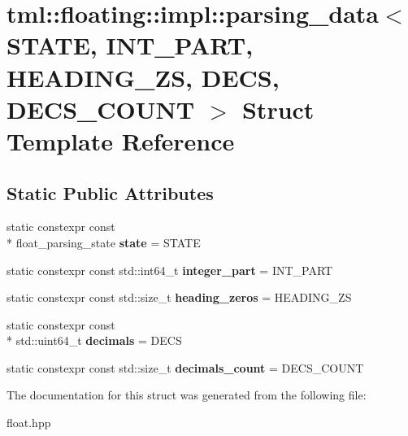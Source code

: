 \hypertarget{structtml_1_1floating_1_1impl_1_1parsing__data}{\section{tml\+:\+:floating\+:\+:impl\+:\+:parsing\+\_\+data$<$ S\+T\+A\+T\+E, I\+N\+T\+\_\+\+P\+A\+R\+T, H\+E\+A\+D\+I\+N\+G\+\_\+\+Z\+S, D\+E\+C\+S, D\+E\+C\+S\+\_\+\+C\+O\+U\+N\+T $>$ Struct Template Reference}
\label{structtml_1_1floating_1_1impl_1_1parsing__data}
}
\subsection*{Static Public Attributes}
\begin{DoxyCompactItemize}
\item 
\hypertarget{structtml_1_1floating_1_1impl_1_1parsing__data_af228f50016a6d00dd2acb4e27a0d3c16}{static constexpr const \\*
float\+\_\+parsing\+\_\+state {\bfseries state} = S\+T\+A\+T\+E}\label{structtml_1_1floating_1_1impl_1_1parsing__data_af228f50016a6d00dd2acb4e27a0d3c16}

\item 
\hypertarget{structtml_1_1floating_1_1impl_1_1parsing__data_ac50563638533c911c27b234af2cc0484}{static constexpr const std\+::int64\+\_\+t {\bfseries integer\+\_\+part} = I\+N\+T\+\_\+\+P\+A\+R\+T}\label{structtml_1_1floating_1_1impl_1_1parsing__data_ac50563638533c911c27b234af2cc0484}

\item 
\hypertarget{structtml_1_1floating_1_1impl_1_1parsing__data_a8f3236517d46c72c13f1ad1893375958}{static constexpr const std\+::size\+\_\+t {\bfseries heading\+\_\+zeros} = H\+E\+A\+D\+I\+N\+G\+\_\+\+Z\+S}\label{structtml_1_1floating_1_1impl_1_1parsing__data_a8f3236517d46c72c13f1ad1893375958}

\item 
\hypertarget{structtml_1_1floating_1_1impl_1_1parsing__data_a36dad24e3be4da8817eb9f158915060c}{static constexpr const \\*
std\+::uint64\+\_\+t {\bfseries decimals} = D\+E\+C\+S}\label{structtml_1_1floating_1_1impl_1_1parsing__data_a36dad24e3be4da8817eb9f158915060c}

\item 
\hypertarget{structtml_1_1floating_1_1impl_1_1parsing__data_a4b45d794106cf67355327b9b769aeccc}{static constexpr const std\+::size\+\_\+t {\bfseries decimals\+\_\+count} = D\+E\+C\+S\+\_\+\+C\+O\+U\+N\+T}\label{structtml_1_1floating_1_1impl_1_1parsing__data_a4b45d794106cf67355327b9b769aeccc}

\end{DoxyCompactItemize}


The documentation for this struct was generated from the following file\+:\begin{DoxyCompactItemize}
\item 
float.\+hpp\end{DoxyCompactItemize}
